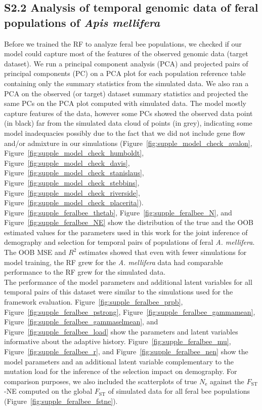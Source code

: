 \documentclass[a4paper, 12pt]{article}
\begin{document}
\subsection*{S2.2 Analysis of temporal genomic data of feral populations of \textit{Apis mellifera}}

Before we trained the RF to analyze feral bee populations, we checked if our model could capture most of the features of the observed genomic data (target dataset). We run a principal component analysis (PCA) and projected pairs of principal components (PC) on a PCA plot for each population reference table containing only the summary statistics from the simulated data. We also ran a PCA on the observed (or target) dataset summary statistics and projected the same PCs on the PCA plot computed with simulated data. The model mostly capture features of the data, however some PCs showed the observed data point (in black) far from the simulated data cloud of points (in grey), indicating some model inadequacies possibly due to the fact that we did not include gene flow and/or admixture in our simulations (Figure~\ref{fig:supple_model_check_avalon}, Figure~\ref{fig:supple_model_check_humboldt}, Figure~\ref{fig:supple_model_check_davis}, Figure~\ref{fig:supple_model_check_stanislaus}, Figure~\ref{fig:supple_model_check_stebbins}, Figure~\ref{fig:supple_model_check_riverside}, Figure~\ref{fig:supple_model_check_placerita}).\\

Figure~\ref{fig:supple_feralbee_thetab}, Figure~\ref{fig:supple_feralbee_N}, and Figure~\ref{fig:supple_feralbee_NE} show the distribution of the true and the OOB estimated values for the parameters used in this work for the joint inference of demography and selection for temporal pairs of populations of feral \textit{A. mellifera}. The OOB MSE and $R^2$ estimates showed that even with fewer simulations for model training, the RF grew for the \textit{A. mellifera} data had comparable performance to the RF grew for the simulated data.\\

The performance of the model parameters and additional latent variables for all temporal pairs of this dataset were similar to the simulations used for the framework evaluation. Figure~\ref{fig:supple_feralbee_prpb}, Figure~\ref{fig:supple_feralbee_pstrong}, Figure~\ref{fig:supple_feralbee_gammamean}, Figure~\ref{fig:supple_feralbee_gammaselmean}, and Figure~\ref{fig:supple_feralbee_load} show the parameters and latent variables informative about the adaptive history. Figure~\ref{fig:supple_feralbee_mu}, Figure~\ref{fig:supple_feralbee_r}, and Figure~\ref{fig:supple_feralbee_nen} show the model parameters and an additional latent variable complementary to the mutation load for the inference of the selection impact on demography. For comparison purposes, we also included the scatterplots of true $N_{\mathrm{e}}$ against the $F_{\mathrm{ST}}$-NE computed on the global $F_{\mathrm{ST}}$ of simulated data for all feral bee populations (Figure~\ref{fig:supple_feralbee_fstne}).\\
\end{document}

